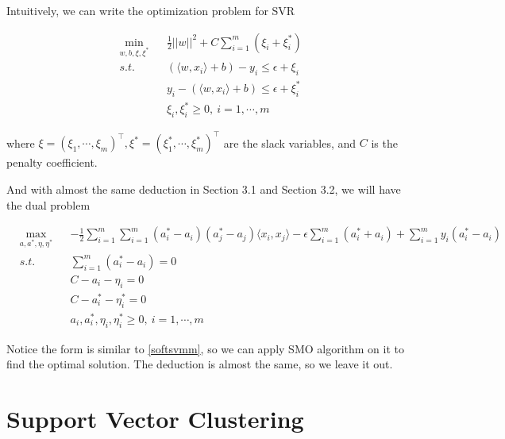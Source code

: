 \documentclass[a4paper]{report}
\begin{document}
Intuitively, we can write the optimization problem for SVR

\begin{align*}
    &\min_{w,b,\xi, \xi^*} && \frac{1}{2}||w||^2 +C\sum_{i=1}^m (\xi_i+\xi_i^*) \\
    &s.t. && (\langle w,x_i\rangle +b)-y_i\leq \epsilon +\xi_i \\
    & && y_i-(\langle w,x_i\rangle +b)\leq \epsilon +\xi_i^* \\
    & && \xi_i,\xi_i^*\geq 0,\ i=1,\cdots,m
\end{align*}

where $\xi=(\xi_1,\cdots,\xi_m)^\top,\xi^*=(\xi_1^*,\cdots,\xi_m^*)^\top$ are the slack variables, and $C$ is the penalty coefficient.

And with almost the same deduction in Section 3.1 and Section 3.2, we will have the dual problem

\begin{align*}
    &\max_{a,a^*,\eta,\eta^*} && -\frac{1}{2}\sum_{i=1}^m\sum_{i=1}^m(a_i^*-a_i)(a_j^*-a_j)\langle x_i,x_j\rangle -\epsilon \sum_{i=1}^m (a_i^*+a_i) + \sum_{i=1}^my_i(a_i^*-a_i) \\
    &s.t. &&\sum_{i=1}^m(a_i^*-a_i)=0 \\
    & &&C-a_i-\eta_i=0 \\
    & &&C-a_i^*-\eta_i^*=0 \\
    & && a_i,a_i^*,\eta_i,\eta_i^*\geq 0,\ i=1,\cdots,m
\end{align*}


Notice the form is similar to \ref{softsvmm}, so we can apply SMO algorithm on it to find the optimal solution. The deduction is almost the same, so we leave it out.

\section{Support Vector Clustering}
\end{document}
